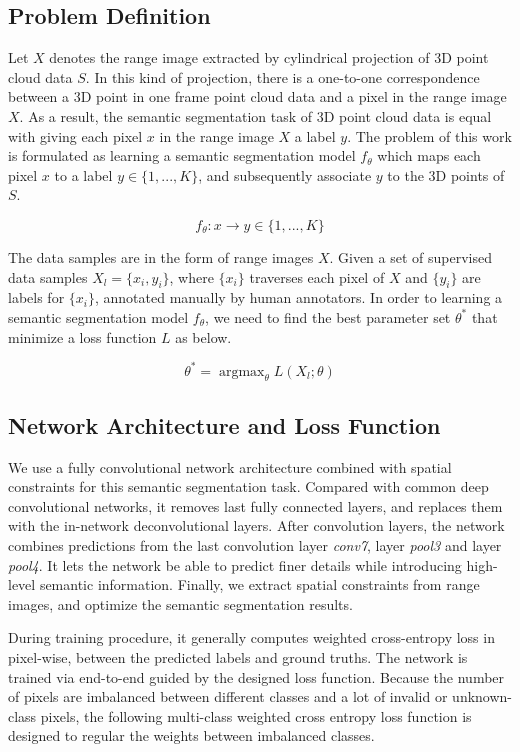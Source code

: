 \subsection{Problem Definition}

Let $X$ denotes the range image extracted by cylindrical projection of 3D point cloud data $S$. In this kind of projection, there is a one-to-one correspondence between a 3D point in one frame point cloud data and a pixel in the range image $X$. As a result, the semantic segmentation task of 3D point cloud data is equal with giving each pixel $x$ in the range image $X$ a label $y$. The problem of this work is formulated as learning a semantic segmentation model $f_{\theta}$ which maps each pixel $x$ to a label $y\in\{1,...,K\}$, and subsequently associate $y$ to the 3D points of $S$.

\begin{equation}
f_{\theta}: x\to y \in \{1,...,K\}
\end{equation}

The data samples are in the form of range images $X$. Given a set of supervised data samples $X_l=\{x_i, y_i\}$, where $\{x_i\}$ traverses each pixel of $X$ and $\{y_i\}$ are labels for $\{x_i\}$, annotated manually by human annotators. 
In order to learning a semantic segmentation model $f_\theta$, we need to find the best parameter set $\theta^*$ that minimize a loss function $L$ as below.

\begin{equation}
\theta^{*}=\mathop{\arg\max}_{\theta}L(X_l; \theta)
\end{equation}

\subsection{Network Architecture and Loss Function}
We use a fully convolutional network architecture combined with spatial constraints for this semantic segmentation task.
Compared with common deep convolutional networks, it removes last fully connected layers, and replaces them with the in-network deconvolutional layers. After convolution layers, the network combines predictions from the last convolution layer \textit{conv7}, layer \textit{pool3} and layer \textit{pool4}. It lets the network be able to predict finer details while introducing high-level semantic information. Finally, we extract spatial constraints from range images, and optimize the semantic segmentation results. 

During training procedure, it generally computes weighted cross-entropy loss in pixel-wise, between the predicted labels and ground truths. The network is trained via end-to-end guided by the designed loss function. Because the number of pixels are imbalanced between different classes and a lot of invalid or unknown-class pixels, the following multi-class weighted cross entropy loss function is designed to regular the weights between imbalanced classes.

